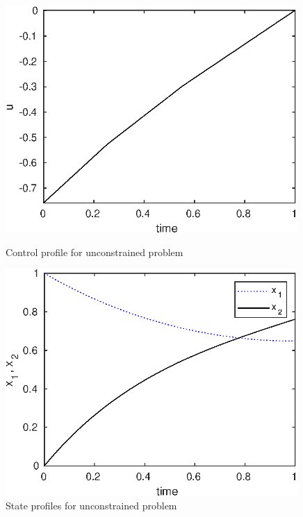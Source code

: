 \begin{figure}[htb]
\begin{minipage}[t]{0.5\linewidth}
\centering
\includegraphics[width=0.99\textwidth]{examples/problem1a/graphs/u_323n.eps}
\caption[Tutorial example 1: control profile]{Control profile for
  unconstrained problem} \label{fig:prob1a_u_323n} 
\end{minipage}
\begin{minipage}[t]{0.5\linewidth}
\centering
\includegraphics[width=0.99\textwidth]{examples/problem1a/graphs/x12_323n.eps}
\caption[Tutorial example 1: state profiles]{State profiles for
  unconstrained problem} \label{fig:prob1a_x12_323n} 
\end{minipage}
\end{figure}

